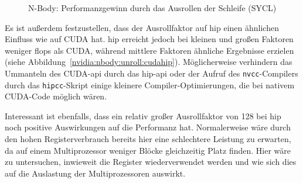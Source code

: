 \begin{figure}
    \centering
    \caption{N-Body: Performanzgewinn durch das Ausrollen der Schleife (SYCL)}
    \label{nvidia:nbody:unroll:sycl}
\end{figure}

Es ist außerdem festzustellen, dass der Ausrollfaktor auf \gls{hip} einen
ähnlichen Einfluss wie auf CUDA hat. \gls{hip} erreicht jedoch bei kleinen und
großen Faktoren weniger \gls{flops} als CUDA, während mittlere Faktoren ähnliche
Ergebnisse erzielen (siehe Abbildung~\ref{nvidia:nbody:unroll:cudahip}).
Möglicherweise verhindern das Ummanteln des CUDA-\gls{api} durch das
\gls{hip}-\gls{api} oder der Aufruf des \texttt{nvcc}-Compilers durch das
\texttt{hipcc}-Skript einige kleinere Compiler-Optimierungen, die bei nativem
CUDA-Code möglich wären.

Interessant ist ebenfalls, dass ein relativ großer Ausrollfaktor von \num{128}
bei \gls{hip} noch positive Auswirkungen auf die Performanz hat.
Normalerweise wäre durch den hohen Registerverbrauch bereits hier eine
schlechtere Leistung zu erwarten, da auf einem Multiprozessor weniger Blöcke
gleichzeitig Platz finden. Hier wäre zu untersuchen, inwieweit die Register
wiederverwendet werden und wie sich dies auf die Auslastung der Multiprozessoren
auswirkt.

